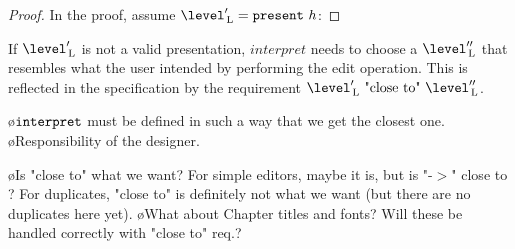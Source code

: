 \begin{proof}
In the proof, assume $\level'\L = \present~h$:

\end{proof}





If $\level'\L$ is not a valid presentation, $interpret$ needs to choose a  $\level''\L$ that resembles what the user intended by performing the edit operation. This is reflected in the specification by the requirement $\level'\L~\text{"close to"}~\level''\L$.

\bl
\o ${\tt interpret}$ must be defined in such a way that we get the closest one.
\o Responsibility of the designer.
\el

\bl
\o Is "close to" what we want? For simple editors, maybe it is, but is "-$>$" close to \rarr? For duplicates, "close to" is definitely not what we want (but there are no duplicates here yet).
\o What about Chapter titles and fonts? Will these be handled correctly with "close to" req.?
\el










